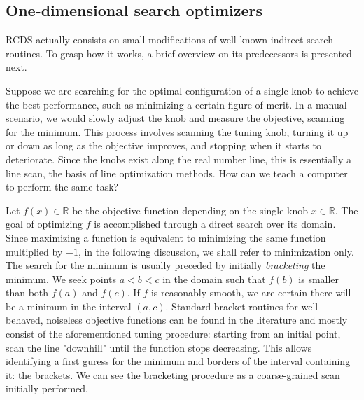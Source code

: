 \subsection{One-dimensional search optimizers}
RCDS actually consists on small modifications of well-known indirect-search routines. To grasp how it works, a brief overview on its predecessors is presented next.

Suppose we are searching for the optimal configuration of a single knob to achieve the best performance, such as minimizing a certain figure of merit. In a manual scenario, we would slowly adjust the knob and measure the objective, scanning for the minimum. This process involves scanning the tuning knob, turning it up or down as long as the objective improves, and stopping when it starts to deteriorate. Since the knobs exist along the real number line, this is essentially a line scan, the basis of line optimization methods. How can we teach a computer to perform the same task?

Let $f(x)\in\mathbb{R}$ be the objective function depending on the single knob $x\in\mathbb{R}$. The goal of optimizing $f$ is accomplished through a direct search over its domain. Since maximizing a function is equivalent to minimizing the same function multiplied by $-1$, in the following discussion, we shall refer to minimization only. The search for the minimum is usually preceded by initially \textit{bracketing} the minimum. We seek points $a < b < c$ in the domain such that $f(b)$ is smaller than both $f(a)$ and $f(c)$. If $f$ is reasonably smooth, we are certain there will be a minimum in the interval $(a, c)$. Standard bracket routines for well-behaved, noiseless objective functions can be found in the literature \cite[section 10.1]{press_numerical_2007} and mostly consist of the aforementioned tuning procedure: starting from an initial point, scan the line "downhill" until the function stops decreasing. This allows identifying a first guress for the minimum and borders of the interval containing it: the brackets. We can see the bracketing procedure as a coarse-grained scan initially performed.


